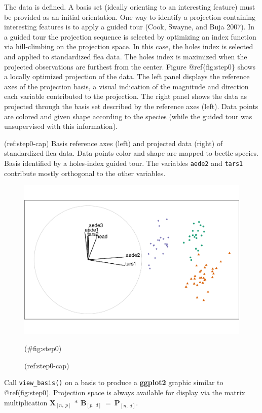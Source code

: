 The data is defined. A basis set (ideally orienting to an interesting feature) must be provided as an initial orientation. One way to identify a projection containing interesting features is to apply a guided tour (Cook, Swayne, and Buja 2007). In a guided tour the projection sequence is selected by optimizing an index function via hill-climbing on the projection space. In this case, the holes index is selected and applied to standardized flea data. The holes index is maximized when the projected observations are furthest from the center. Figure @ref\{fig:step0\} shows a locally optimized projection of the data. The left panel displays the reference axes of the projection basis, a visual indication of the magnitude and direction each variable contributed to the projection. The right panel shows the data as projected through the basis set described by the reference axes (left). Data points are colored and given shape according to the species (while the guided tour was unsupervised with this information).

(ref:step0-cap) Basis reference axes (left) and projected data (right) of standardized flea data. Data points color and shape are mapped to beetle species. Basis identified by a holes-index guided tour. The variables \texttt{aede2} and \texttt{tars1} contribute mostly orthogonal to the other variables.

\begin{Schunk}
\begin{figure}

{\centering \includegraphics[width=0.6\linewidth]{spinifex_paper_files/figure-latex/step0-1} 

}

\caption[(ref:step0-cap)]{(ref:step0-cap)}(\#fig:step0)
\end{figure}
\end{Schunk}

Call \texttt{view\_basis()} on a basis to produce a \textbf{ggplot2} graphic similar to @ref(fig:step0). Projection space is always available for display via the matrix multiplication \(\textbf{X}_{[n,~p]} ~*~ \textbf{B}_{[p,~d]} ~=~ \textbf{P}_{[n,~d]}\).

